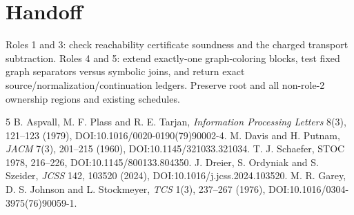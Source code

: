 \documentclass[11pt]{article}
\begin{document}
\section{Handoff}
Roles 1 and 3: check reachability certificate soundness and the charged transport subtraction. Roles 4 and 5: extend exactly-one graph-coloring blocks, test fixed graph separators versus symbolic joins, and return exact source/normalization/continuation ledgers. Preserve root and all non-role-2 ownership regions and existing schedules.

\begin{thebibliography}{5}
 B. Aspvall, M. F. Plass and R. E. Tarjan, \emph{Information Processing Letters} 8(3), 121--123 (1979), DOI:10.1016/0020-0190(79)90002-4.
 M. Davis and H. Putnam, \emph{JACM} 7(3), 201--215 (1960), DOI:10.1145/321033.321034.
 T. J. Schaefer, STOC 1978, 216--226, DOI:10.1145/800133.804350.
 J. Dreier, S. Ordyniak and S. Szeider, \emph{JCSS} 142, 103520 (2024), DOI:10.1016/j.jcss.2024.103520.
 M. R. Garey, D. S. Johnson and L. Stockmeyer, \emph{TCS} 1(3), 237--267 (1976), DOI:10.1016/0304-3975(76)90059-1.
\end{thebibliography}
\end{document}
